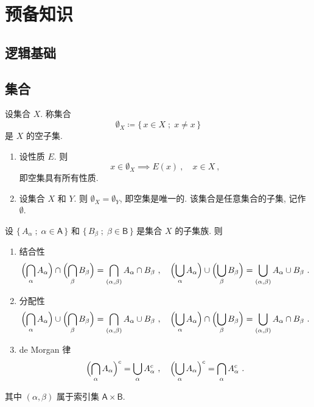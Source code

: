 \chapter{预备知识}

\section{逻辑基础}

\section{集合}

\begin{definition}[空集]
    设集合 \(X\). 称集合
    \[
        \emptyset_X \coloneqq \{\, x \in X \;;\; x \neq x \,\}
    \]
    是 \(X\) 的空子集.
\end{definition}

\begin{remark}\label{rem:emptyset}
    \begin{enumerate}
        \item 设性质 \(E\). 则
        \[
            x \in \emptyset_X \implies E(x)\ ,\quad x \in X\ ,
        \]
        即空集具有所有性质.
        \item 设集合 \(X\) 和 \(Y\). 则 \(\emptyset_X = \emptyset_Y\), 即空集是唯一的. 该集合是任意集合的子集, 记作 \(\emptyset\).
    \end{enumerate}
\end{remark}

\begin{proposition}\label{prop:operations-of-family-of-sets}
    设 \(\{\, A_\alpha \;;\; \alpha \in \mathsf A \,\}\) 和 \(\{\, B_\beta \;;\; \beta \in \mathsf B \,\}\) 是集合 \(X\) 的子集族. 则
    \begin{enumerate}
        \item 结合性
        \[
            \Bigl(\bigcap_\alpha A_\alpha\Bigr) \cap \Bigl(\bigcap_\beta B_\beta\Bigr) = \bigcap_{(\alpha, \beta)} A_\alpha \cap B_\beta\ ,\quad \Bigl(\bigcup_\alpha A_\alpha\Bigr) \cup \Bigl(\bigcup_\beta B_\beta\Bigr) = \bigcup_{(\alpha, \beta)} A_\alpha \cup B_\beta\ .
        \]
        \item 分配性
        \[
            \Bigl(\bigcap_\alpha A_\alpha\Bigr) \cup \Bigl(\bigcap_\beta B_\beta\Bigr) = \bigcap_{(\alpha, \beta)} A_\alpha \cup B_\beta\ ,\quad \Bigl(\bigcup_\alpha A_\alpha\Bigr) \cap \Bigl(\bigcup_\beta B_\beta\Bigr) = \bigcup_{(\alpha, \beta)} A_\alpha \cap B_\beta\ .
        \]
        \item de Morgan 律
        \[
            \Bigl(\bigcap_\alpha A_\alpha\Bigr)^c = \bigcup_\alpha A_\alpha^c\ ,\quad \Bigl(\bigcup_\alpha A_\alpha\Bigr)^c = \bigcap_\alpha A_\alpha^c\ .
        \]
    \end{enumerate}
    其中 \((\alpha, \beta)\) 属于索引集 \(\mathsf A \times \mathsf B\).
\end{proposition}

